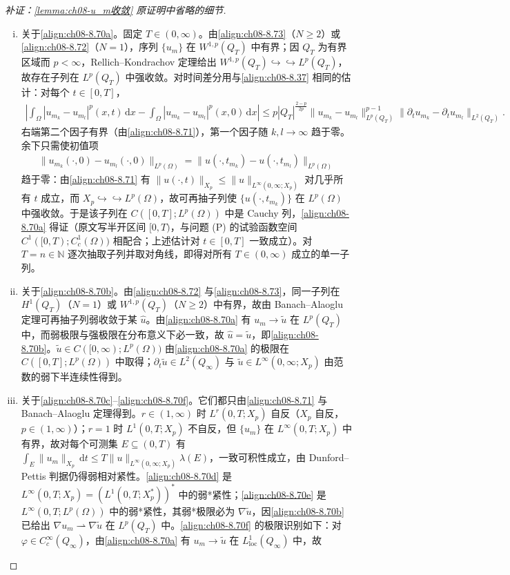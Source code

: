 \documentclass[../../main.tex]{subfiles}%
\begin{document}
\begin{proof}[补证：\cref{lemma:ch08-u_m收敛} 原证明中省略的细节]
\begin{enumerate}[(i)]
\item 关于\eqref{align:ch08-8.70a}。固定 $T\in(0,\infty)$。由\eqref{align:ch08-8.73}（$N\geqslant2$）或\eqref{align:ch08-8.72}（$N=1$），序列 $\{u_m\}$ 在 $W^{1,p}(Q_T)$ 中有界；因 $Q_T$ 为有界区域而 $p<\infty$，Rellich--Kondrachov 定理给出 $W^{1,p}(Q_T)\hookrightarrow\hookrightarrow L^p(Q_T)$，故存在子列在 $L^p(Q_T)$ 中强收敛。对时间差分用与\eqref{align:ch08-8.37} 相同的估计：对每个 $t\in[0,T]$，
\begin{align*}
\left|\int_\Omega|u_{m_k}-u_{m_l}|^p(x,t)\,\mathrm{d}x-\int_\Omega|u_{m_k}-u_{m_l}|^p(x,0)\,\mathrm{d}x\right|
\leqslant p|Q_T|^{\frac{2-p}{2p}}\|u_{m_k}-u_{m_l}\|^{p-1}_{L^p(Q_T)}
\|\partial_t u_{m_k}-\partial_t u_{m_l}\|_{L^2(Q_T)}.
\end{align*}
右端第二个因子有界（由\eqref{align:ch08-8.71}），第一个因子随 $k,l\to\infty$ 趋于零。余下只需使初值项
\begin{align*}
\|u_{m_k}(\cdot,0)-u_{m_l}(\cdot,0)\|_{L^p(\Omega)}=\|u(\cdot,t_{m_k})-u(\cdot,t_{m_l})\|_{L^p(\Omega)}
\end{align*}
趋于零：由\eqref{align:ch08-8.71} 有 $\|u(\cdot,t)\|_{X_p}\leqslant\|u\|_{L^\infty(0,\infty;X_p)}$ 对几乎所有 $t$ 成立，而 $X_p\hookrightarrow\hookrightarrow L^p(\Omega)$，故可再抽子列使 $\{u(\cdot,t_{m_k})\}$ 在 $L^p(\Omega)$ 中强收敛。于是该子列在 $C([0,T];L^p(\Omega))$ 中是 Cauchy 列，\eqref{align:ch08-8.70a} 得证（原文写半开区间 $[0,T)$，与问题 (P) 的试验函数空间 $C^1([0,T);C^1_c(\Omega))$ 相配合；上述估计对 $t\in[0,T]$ 一致成立）。对 $T=n\in\mathbb{N}$ 逐次抽取子列并取对角线，即得对所有 $T\in(0,\infty)$ 成立的单一子列。
\item 关于\eqref{align:ch08-8.70b}。由\eqref{align:ch08-8.72} 与\eqref{align:ch08-8.73}，同一子列在 $H^1(Q_T)$（$N=1$）或 $W^{1,p}(Q_T)$（$N\geqslant2$）中有界，故由 Banach--Alaoglu 定理可再抽子列弱收敛于某 $\hat u$。由\eqref{align:ch08-8.70a} 有 $u_m\to\tilde u$ 在 $L^p(Q_T)$ 中，而弱极限与强极限在分布意义下必一致，故 $\hat u=\tilde u$，即\eqref{align:ch08-8.70b}。$\tilde u\in C([0,\infty);L^p(\Omega))$ 由\eqref{align:ch08-8.70a} 的极限在 $C([0,T];L^p(\Omega))$ 中取得；$\partial_t\tilde u\in L^2(Q_\infty)$ 与 $\tilde u\in L^\infty(0,\infty;X_p)$ 由范数的弱下半连续性得到。
\item 关于\eqref{align:ch08-8.70c}--\eqref{align:ch08-8.70f}。它们都只由\eqref{align:ch08-8.71} 与 Banach--Alaoglu 定理得到。$r\in(1,\infty)$ 时 $L^r(0,T;X_p)$ 自反（$X_p$ 自反，$p\in(1,\infty)$）；$r=1$ 时 $L^1(0,T;X_p)$ 不自反，但 $\{u_m\}$ 在 $L^\infty(0,T;X_p)$ 中有界，故对每个可测集 $E\subseteq(0,T)$ 有 $\int_E\|u_m\|_{X_p}\,\mathrm{d}t\leqslant T\|u\|_{L^\infty(0,\infty;X_p)}\lambda(E)$，一致可积性成立，由 Dunford--Pettis 判据仍得弱相对紧性。\eqref{align:ch08-8.70d} 是 $L^\infty(0,T;X_p)=(L^1(0,T;X_p^*))^*$ 中的弱*紧性；\eqref{align:ch08-8.70e} 是 $L^\infty(0,T;L^p(\Omega))$ 中的弱*紧性，其弱*极限必为 $\nabla\tilde u$，因\eqref{align:ch08-8.70b} 已给出 $\nabla u_m\rightharpoonup\nabla\tilde u$ 在 $L^p(Q_T)$ 中。\eqref{align:ch08-8.70f} 的极限识别如下：对 $\varphi\in C_c^\infty(Q_\infty)$，由\eqref{align:ch08-8.70a} 有 $u_m\to\tilde u$ 在 $L^1_{\mathrm{loc}}(Q_\infty)$ 中，故

\end{enumerate}
\end{proof}
\end{document}
